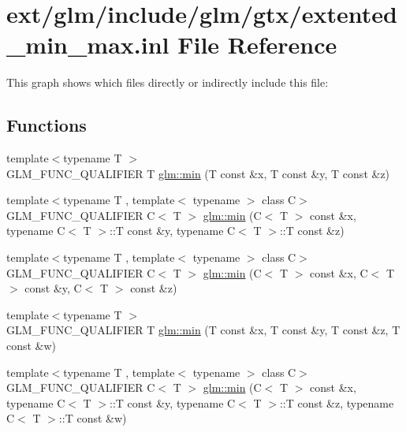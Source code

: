 \hypertarget{extented__min__max_8inl}{\section{ext/glm/include/glm/gtx/extented\-\_\-min\-\_\-max.inl File Reference}
\label{extented__min__max_8inl}
}
This graph shows which files directly or indirectly include this file\-:
\subsection*{Functions}
\begin{DoxyCompactItemize}
\item 
{\footnotesize template$<$typename T $>$ }\\G\-L\-M\-\_\-\-F\-U\-N\-C\-\_\-\-Q\-U\-A\-L\-I\-F\-I\-E\-R T \hyperlink{group__gtx__extented__min__max_ga713d3f9b3e76312c0d314e0c8611a6a6}{glm\-::min} (T const \&x, T const \&y, T const \&z)
\item 
{\footnotesize template$<$typename T , template$<$ typename $>$ class C$>$ }\\G\-L\-M\-\_\-\-F\-U\-N\-C\-\_\-\-Q\-U\-A\-L\-I\-F\-I\-E\-R C$<$ T $>$ \hyperlink{group__gtx__extented__min__max_ga74d1a96e7cdbac40f6d35142d3bcbbd4}{glm\-::min} (C$<$ T $>$ const \&x, typename C$<$ T $>$\-::T const \&y, typename C$<$ T $>$\-::T const \&z)
\item 
{\footnotesize template$<$typename T , template$<$ typename $>$ class C$>$ }\\G\-L\-M\-\_\-\-F\-U\-N\-C\-\_\-\-Q\-U\-A\-L\-I\-F\-I\-E\-R C$<$ T $>$ \hyperlink{group__gtx__extented__min__max_ga42b5c3fc027fd3d9a50d2ccc9126d9f0}{glm\-::min} (C$<$ T $>$ const \&x, C$<$ T $>$ const \&y, C$<$ T $>$ const \&z)
\item 
{\footnotesize template$<$typename T $>$ }\\G\-L\-M\-\_\-\-F\-U\-N\-C\-\_\-\-Q\-U\-A\-L\-I\-F\-I\-E\-R T \hyperlink{group__gtx__extented__min__max_ga95466987024d03039607f09e69813d69}{glm\-::min} (T const \&x, T const \&y, T const \&z, T const \&w)
\item 
{\footnotesize template$<$typename T , template$<$ typename $>$ class C$>$ }\\G\-L\-M\-\_\-\-F\-U\-N\-C\-\_\-\-Q\-U\-A\-L\-I\-F\-I\-E\-R C$<$ T $>$ \hyperlink{group__gtx__extented__min__max_ga4fe35dd31dd0c45693c9b60b830b8d47}{glm\-::min} (C$<$ T $>$ const \&x, typename C$<$ T $>$\-::T const \&y, typename C$<$ T $>$\-::T const \&z, typename C$<$ T $>$\-::T const \&w)

\end{DoxyCompactItemize}
